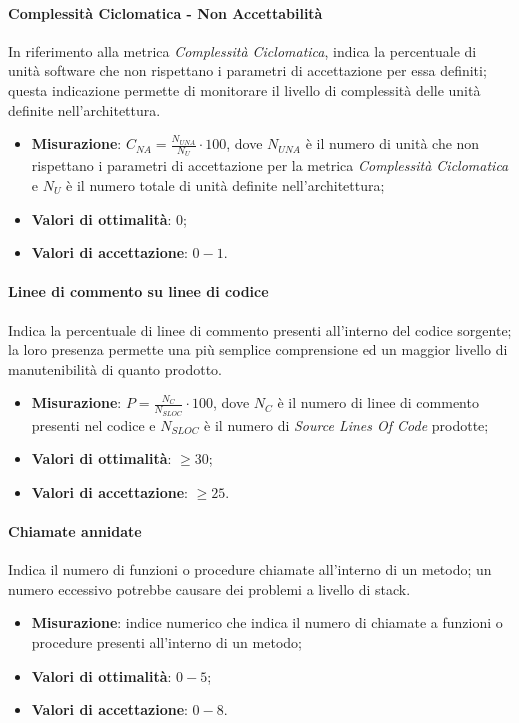 \paragraph{Complessità Ciclomatica - Non Accettabilità}
\label{complCiclomNA}
In riferimento alla metrica \textit{Complessità Ciclomatica}, indica la percentuale di unità software che non rispettano i parametri di accettazione per essa definiti; questa indicazione permette di monitorare il livello di complessità delle unità definite nell'architettura.
\begin{itemize}
\item \textbf{Misurazione}: $C_{NA}=\frac{N_{UNA}}{N_{U}} \cdot 100$, dove $N_{UNA}$ è il numero di unità che non rispettano i parametri di accettazione per la metrica \textit{Complessità Ciclomatica} e $N_{U}$ è il numero totale di unità definite nell'architettura;
\item \textbf{Valori di ottimalità}: $0$;
\item \textbf{Valori di accettazione}: $0 - 1$.
\end{itemize}
\paragraph{Linee di commento su linee di codice}
\label{lineeCommento}
Indica la percentuale di linee di commento presenti all'interno del codice sorgente; la loro presenza permette una più semplice comprensione ed un maggior livello di manutenibilità di quanto prodotto.
\begin{itemize}
\item \textbf{Misurazione}: $P=\frac{N_{C}}{N_{SLOC}} \cdot 100$, dove $N_{C}$ è il numero di linee di commento presenti nel codice e $N_{SLOC}$ è il numero di \textit{Source Lines Of Code} prodotte;
\item \textbf{Valori di ottimalità}: $\geq 30$;
\item \textbf{Valori di accettazione}: $\geq 25$.
\end{itemize}
\paragraph{Chiamate annidate}
Indica il numero di funzioni o procedure chiamate all'interno di un metodo; un numero eccessivo potrebbe causare dei problemi a livello di stack.
\begin{itemize}
\item \textbf{Misurazione}: indice numerico che indica il numero di chiamate a funzioni o procedure presenti all'interno di un metodo;
\item \textbf{Valori di ottimalità}: $0 - 5$;
\item \textbf{Valori di accettazione}: $0 - 8$.
\end{itemize}

